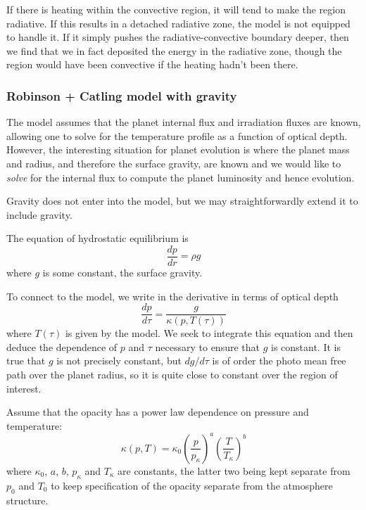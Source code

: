 \documentclass{emulateapj}
\begin{document}
If there is heating within the convective region, it will tend to make
the region radiative.  If this results in a detached radiative zone,
the  model is not equipped to handle
it.  If it simply pushes the radiative-convective boundary deeper,
then we find that we in fact deposited the energy in the radiative
zone, though the region would have been convective if the heating
hadn't been there.

\subsubsection{Robinson + Catling model with gravity}
The  model assumes that the planet
internal flux and irradiation fluxes are known, allowing one to solve
for the temperature profile as a function of optical depth.  However,
the interesting situation for planet evolution is where the planet
mass and radius, and therefore the surface gravity, are known and we
would like to {\em solve} for the internal flux to compute the planet
luminosity and hence evolution.

Gravity does not enter into the 
model, but we may straightforwardly extend it to include gravity.

The equation of hydrostatic equilibrium is 
\begin{equation}
    \frac{dp}{dr} = \rho g
\end{equation}
where $g$ is some constant, the surface gravity.

To connect to the  model, we write in
the derivative in terms of optical depth
\begin{equation}
  \frac{dp}{d\tau} = \frac{g}{\kappa(p,T(\tau))}
  \label{eq:hse}
\end{equation}
where $T(\tau)$ is given by the 
model.  We seek to integrate this equation and then deduce the
dependence of $p$ and $\tau$ necessary to ensure that $g$ is
constant.  It is true that $g$ is not precisely constant, but
$dg/d\tau$ is of order the photo mean free path over the planet
radius, so it is quite close to constant over the region of interest.

Assume that the opacity has a power law dependence on pressure and
temperature:
\begin{equation}
  \kappa(p,T) = \kappa_0 \left(\frac{p}{p_\kappa}\right)^a
  \left(\frac{T}{T_\kappa}\right)^b
  \label{eq:power-law-opacity}
\end{equation}
where $\kappa_0$, $a$, $b$, $p_\kappa$ and $T_\kappa$ are constants,
the latter two being kept separate from $p_0$ and $T_0$ to keep
specification of the opacity separate from the atmosphere structure.
\end{document}
